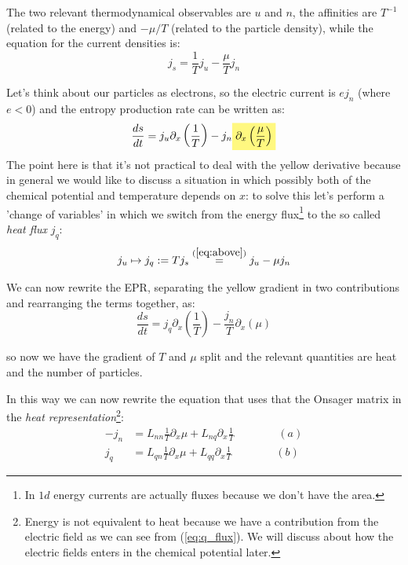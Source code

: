 \documentclass[\main/main.tex]{subfiles}
\begin{document}
The two relevant thermodynamical observables are $u$ and $n$, the affinities are $T^{-1}$ (related to the energy) and $-\mu/T$ (related to the particle density), while the equation for the current densities is:
\begin{equation}
    j_{s}=\frac{1}{T} j_{u}-\frac{\mu}{T} j_{n}
    \label{eq:above}
\end{equation}

Let's think about our particles as electrons, so the electric current is $ej_n$ (where $e<0$) and the entropy production rate can be written as:
\begin{equation}
    \frac{d s}{d t}=j_{u}\partial_{x}\left(\frac{1}{T}\right) - j_{n}\hlc{yellow}{\partial_{x}\left(\frac{\mu}{T}\right)}
\end{equation}
The point here is that it's not practical to deal with the yellow derivative because in general we would like to discuss a situation in which possibly both of the chemical potential and temperature depends on $x$: to solve this let's perform a 'change of variables' in which we switch from the energy flux\footnote{In $1d$ energy currents are actually fluxes because we don't have the area.} to the so called \textit{heat flux} $j_q$:
\begin{equation}
    j_u\mapsto j_q:=T j_s \overset{(\ref{eq:above})}{=} j_u-\mu j_n
    \label{eq:q_flux}
\end{equation}

We can now rewrite the EPR, separating the yellow gradient in two contributions and rearranging the terms together, as:
\begin{equation}
    \frac{d s}{d t}=j_{q}\partial_{x} \left(\frac{1}{T}\right) -\frac{j_{n}}{T}\partial_{x}\left( \mu\right) 
\end{equation}

so now we have the gradient of $T$ and $\mu$ split and the relevant quantities are heat and the number of particles.

In this way we can now rewrite the equation that uses that the Onsager matrix in the \textit{heat representation}\footnote{Energy is not equivalent to heat because we have a contribution from the electric field as we can see from (\ref{eq:q_flux}). We will discuss about how the electric fields enters in the chemical potential later.}:
\begin{equation}
\begin{aligned}
-j_{n} &=L_{n n} \frac{1}{T} \partial_{x} \mu+L_{n q} \partial_{x} \frac{1}{T} \qquad\qquad (a) \\
j_{q} &=L_{q n} \frac{1}{T} \partial_{x} \mu+L_{q q} \partial_{x} \frac{1}{T}\qquad \qquad (b)
\end{aligned}
\label{eq:heat_repr}
\end{equation}
\end{document}
